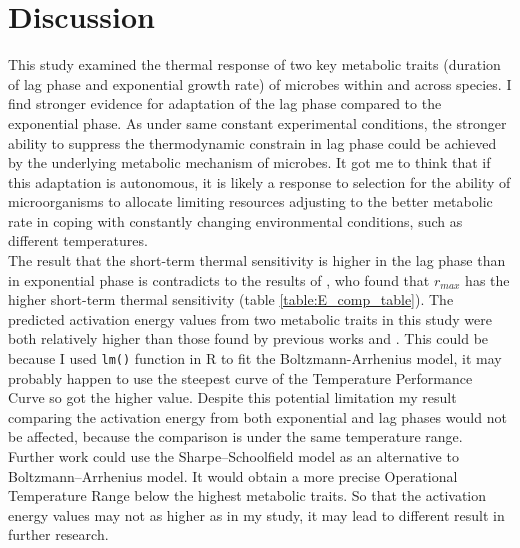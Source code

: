 \documentclass[a4paper]{article}
\begin{document}
\section{Discussion}

This study examined the thermal response of two key metabolic traits (duration of lag phase and exponential growth rate) of microbes within and across species. I find stronger evidence for adaptation of the lag phase compared to the exponential phase. As under same constant experimental conditions, the stronger ability to suppress the thermodynamic constrain in lag phase could be achieved by the underlying metabolic mechanism of microbes. It got me to think that if this adaptation is autonomous, it is likely a response to selection for the ability of microorganisms to allocate limiting resources adjusting to the better metabolic rate in coping with constantly changing environmental conditions, such as different temperatures. \\


The result that the short-term thermal sensitivity is higher in the lag phase than in exponential phase is contradicts to the results of \citealt{de2018determination},  who found that $r_{max}$ has the higher short-term thermal sensitivity (table \ref{table:E_comp_table}). The predicted activation energy values from two metabolic traits in this study were both relatively higher than those found by previous works \citealt{de2018determination} and \citealt{smith2019community}. This could be because I used \texttt{lm()} function in R to fit the Boltzmann-Arrhenius model, it may probably happen to use the steepest curve of the Temperature Performance Curve so got the higher value. Despite this potential limitation my result comparing the activation energy from both exponential and lag phases would not be affected, because the comparison is under the same temperature range. Further work could use the Sharpe–Schoolfield model as an alternative to Boltzmann–Arrhenius model. It would obtain a more precise Operational Temperature Range below the highest metabolic traits. So that the activation energy values may not as higher as in my study, it may lead to different result in further research. \\
\begin{center}

\end{center}
\end{document}
